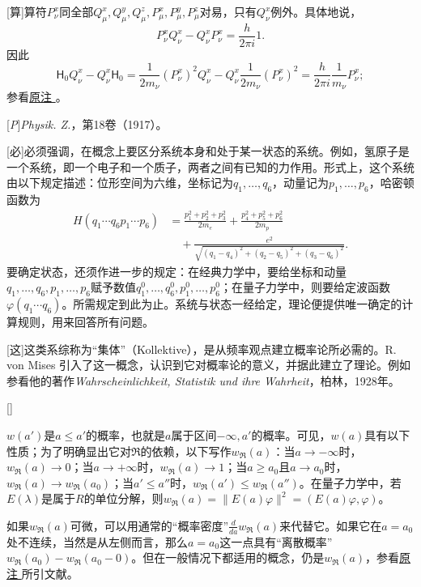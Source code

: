 \documentclass[fontsize=13pt,twoside,openany,headings=normal,parskip=false,bookmarkpackage=false,DIV=calc]{scrbook}
\begin{document}
[算]{算符$P_\nu^x$同全部$Q_\mu^x,\allowbreak Q_\mu^y,\allowbreak Q_\mu^z,\allowbreak P_\mu^x,\allowbreak P_\mu^y,\allowbreak P_\mu^z$对易，只有$Q_\nu^x$例外。具体地说，
\[
P_\nu^xQ_\nu^x-Q_\nu^xP_\nu^x=\frac h{2\pi i}1.
\]
因此
\[
\mathsf H_0Q_\nu^x-Q_\nu^x\mathsf H_0
=\frac1{2m_\nu}(P_\nu^x)^2Q_\nu^x-Q_\nu^x\frac1{2m_\nu}(P_\nu^x)^2
=\frac h{2\pi i}\frac1{m_\nu}P_\nu^x;
\]
参看\CJKglue \hyperlink{note-143}{原注 }。}

[\emph{P}]{\emph{Physik. Z.}，第18卷（1917）。}

[必]{必须强调，在概念上要区分系统本身和处于某一状态的系统。例如，氢原子是一个系统，即一个电子和一个质子，两者之间有已知的力作用。形式上，这个系统由以下规定描述：位形空间为六维，坐标记为$q_1,\allowbreak \ldots,\allowbreak q_6$，动量记为$p_1,\allowbreak \ldots,\allowbreak p_6$，哈密顿函数为
\begin{align*}
H(q_1\cdots q_6p_1\cdots p_6)
&=\frac{p_1^2+p_2^2+p_3^2}{2m_e}+\frac{p_4^2+p_5^2+p_6^2}{2m_p}\\
&\quad+\frac{e^2}{\sqrt{(q_1-q_4)^2+(q_2-q_5)^2+(q_3-q_6)^2}}.
\end{align*}
要确定状态，还须作进一步的规定：在经典力学中，要给坐标和动量$q_1,\allowbreak \ldots,\allowbreak q_6,\allowbreak p_1,\allowbreak \ldots,\allowbreak p_6$赋予数值$q_1^0,\allowbreak \ldots,\allowbreak q_6^0,\allowbreak p_1^0,\allowbreak \ldots,\allowbreak p_6^0$；在量子力学中，则要给定波函数$\varphi(q_1\cdots q_6)$。所需规定到此为止。系统与状态一经给定，理论便提供唯一确定的计算规则，用来回答所有问题。}

[这]{这类系综称为“集体”（Kollektive），是从频率观点建立概率论所必需的。R. von Mises 引入了这一概念，认识到它对概率论的意义，并据此建立了理论。例如参看他的著作\emph{Wahr\-schein\-lich\-keit, Statistik und ihre Wahrheit}，柏林，1928年。}

[]{$w(a')$是$a\le a'$的概率，也就是$a$属于区间$-\infty,\allowbreak a'$的概率。可见，$w(a)$具有以下性质；为了明确显出它对$\mathfrak R$的依赖，以下写作$w_{\mathfrak R}(a)$：当$a\to-\infty$时，$w_{\mathfrak R}(a)\to0$；当$a\to+\infty$时，$w_{\mathfrak R}(a)\to1$；当$a\ge a_0$且$a\to a_0$时，$w_{\mathfrak R}(a)\to w_{\mathfrak R}(a_0)$；当$a'\le a''$时，$w_{\mathfrak R}(a')\le w_{\mathfrak R}(a'')$。在量子力学中，若$E(\lambda)$是属于$R$的单位分解，则$w_{\mathfrak R}(a)=\|E(a)\varphi\|^2=(E(a)\varphi,\allowbreak \varphi)$。

如果$w_{\mathfrak R}(a)$可微，可以用通常的“概率密度”$\frac d{da}w_{\mathfrak R}(a)$来代替它。如果它在$a=a_0$处不连续，当然是从左侧而言，那么$a=a_0$这一点具有“离散概率”$w_{\mathfrak R}(a_0)-w_{\mathfrak R}(a_0-0)$。但在一般情况下都适用的概念，仍是$w_{\mathfrak R}(a)$，参看\CJKglue \hyperlink{note-156}{原注 } 所引文献。}
\end{document}
